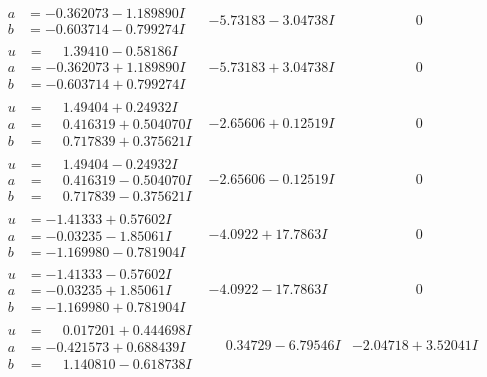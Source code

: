 \documentclass[1p]{elsarticle_modified}
\theoremstyle{definition}
\begin{document}
$$\begin{array}{c|c|c}
\begin{aligned}
a &= -0.362073 - 1.189890 I \\
b &= -0.603714 - 0.799274 I\end{aligned}
 & -5.73183 - 3.04738 I & \phantom{-0.000000 } 0 \\ \hline\begin{aligned}
u &= \phantom{-}1.39410 - 0.58186 I \\
a &= -0.362073 + 1.189890 I \\
b &= -0.603714 + 0.799274 I\end{aligned}
 & -5.73183 + 3.04738 I & \phantom{-0.000000 } 0 \\ \hline\begin{aligned}
u &= \phantom{-}1.49404 + 0.24932 I \\
a &= \phantom{-}0.416319 + 0.504070 I \\
b &= \phantom{-}0.717839 + 0.375621 I\end{aligned}
 & -2.65606 + 0.12519 I & \phantom{-0.000000 } 0 \\ \hline\begin{aligned}
u &= \phantom{-}1.49404 - 0.24932 I \\
a &= \phantom{-}0.416319 - 0.504070 I \\
b &= \phantom{-}0.717839 - 0.375621 I\end{aligned}
 & -2.65606 - 0.12519 I & \phantom{-0.000000 } 0 \\ \hline\begin{aligned}
u &= -1.41333 + 0.57602 I \\
a &= -0.03235 - 1.85061 I \\
b &= -1.169980 - 0.781904 I\end{aligned}
 & -4.0922 + 17.7863 I & \phantom{-0.000000 } 0 \\ \hline\begin{aligned}
u &= -1.41333 - 0.57602 I \\
a &= -0.03235 + 1.85061 I \\
b &= -1.169980 + 0.781904 I\end{aligned}
 & -4.0922 - 17.7863 I & \phantom{-0.000000 } 0 \\ \hline\begin{aligned}
u &= \phantom{-}0.017201 + 0.444698 I \\
a &= -0.421573 + 0.688439 I \\
b &= \phantom{-}1.140810 - 0.618738 I\end{aligned}
 & \phantom{-}0.34729 - 6.79546 I & -2.04718 + 3.52041 I \\ \hline\begin{aligned}

\end{aligned}
\end{array}$$
\end{document}
